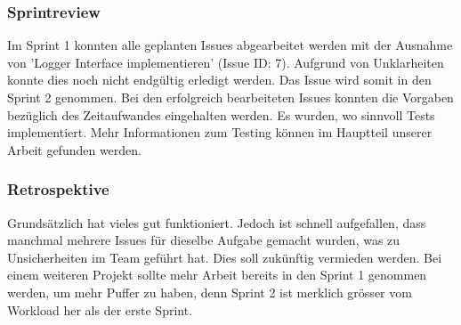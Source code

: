 \documentclass[11pt]{article}
\begin{document}
\subsubsection{Sprintreview}
Im Sprint 1 konnten alle geplanten Issues abgearbeitet werden mit der Ausnahme von 'Logger Interface implementieren' (Issue ID: 7). Aufgrund von Unklarheiten konnte dies noch nicht endgültig erledigt werden. Das Issue wird somit in den Sprint 2 genommen. Bei den erfolgreich bearbeiteten Issues konnten die Vorgaben bezüglich des Zeitaufwandes eingehalten werden. Es wurden, wo sinnvoll Tests implementiert. Mehr Informationen zum Testing können im Hauptteil unserer Arbeit gefunden werden.
\begin{table}[!h]
\end{table} 


\subsubsection{Retrospektive}
Grundsätzlich hat vieles gut funktioniert. Jedoch ist schnell aufgefallen, dass manchmal mehrere Issues für dieselbe Aufgabe gemacht wurden, was zu Unsicherheiten im Team geführt hat. Dies soll zukünftig vermieden werden. Bei einem weiteren Projekt sollte mehr Arbeit bereits in den Sprint 1 genommen werden, um mehr Puffer zu haben, denn Sprint 2 ist merklich grösser vom Workload her als der erste Sprint.
\end{document}
